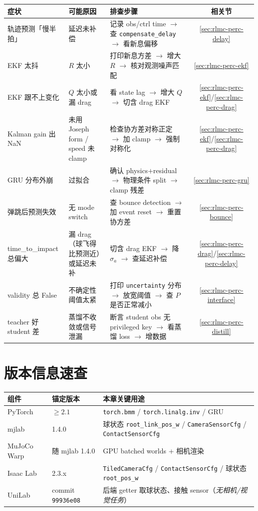 \begin{center}
\small
\begin{tabular}{@{}p{3.0cm}p{3.0cm}p{5.5cm}c@{}}
\toprule
症状 & 可能原因 & 排查步骤 & 相关节 \\
\midrule
轨迹预测「慢半拍」 & 延迟未补偿 & 记录 obs/ctrl time $\to$ 查 \verb|compensate_delay| $\to$ 看新息偏移 & \ref{sec:rlmc-perc-delay} \\
EKF 太抖 & $R$ 太小 & 打印新息方差 $\to$ 增大 $R$ $\to$ 核对观测噪声匹配 & \ref{sec:rlmc-perc-ekf} \\
EKF 跟不上变化 & $Q$ 太小或漏 drag & 看 state lag $\to$ 增大 $Q$ $\to$ 切含 drag EKF & \ref{sec:rlmc-perc-ekf}/\ref{sec:rlmc-perc-drag} \\
Kalman gain 出 NaN & 未用 Joseph form / speed 未 clamp & 检查协方差对称正定 $\to$ 加 clamp $\to$ 强制对称化 & \ref{sec:rlmc-perc-ekf}/\ref{sec:rlmc-perc-drag} \\
GRU 分布外崩 & 过拟合 & 确认 physics$+$residual $\to$ 物理条件 split $\to$ clamp 残差 & \ref{sec:rlmc-perc-gru} \\
弹跳后预测失效 & 无 mode switch & 查 bounce detection $\to$ 加 event reset $\to$ 重置协方差 & \ref{sec:rlmc-perc-bounce} \\
time\_to\_impact 总偏大 & 漏 drag（球飞得比预测近）或延迟未补 & 切含 drag EKF $\to$ 降 $\sigma_a$ $\to$ 查延迟补偿 & \ref{sec:rlmc-perc-drag}/\ref{sec:rlmc-perc-delay} \\
validity 总 False & 不确定性阈值太紧 & 打印 \verb|uncertainty| 分布 $\to$ 放宽阈值 $\to$ 查 $P$ 是否正常减小 & \ref{sec:rlmc-perc-interface} \\
teacher 好 student 差 & 蒸馏不收敛或信号泄漏 & 断言 student obs 无 privileged key $\to$ 看蒸馏 loss $\to$ 增数据 & \ref{sec:rlmc-perc-distill} \\
\bottomrule
\end{tabular}
\end{center}

\section*{版本信息速查}
\label{sec:rlmc-perc-versions}

\begin{center}
\small
\begin{tabular}{@{}lll@{}}
\toprule
组件 & 锚定版本 & 本章关键用途 \\
\midrule
PyTorch & $\ge 2.1$ & \verb|torch.bmm| / \verb|torch.linalg.inv| / GRU \\
mjlab & 1.4.0 & 球状态 \verb|root_link_pos_w| / \verb|CameraSensorCfg| / \verb|ContactSensorCfg| \\
MuJoCo Warp & 随 mjlab 1.4.0 & GPU batched worlds + 相机渲染 \\
Isaac Lab & 2.3.x & \verb|TiledCameraCfg| / \verb|ContactSensorCfg| / 球状态 \verb|root_pos_w| \\
UniLab & commit \texttt{99936e08} & 后端 getter 取球状态、接触 sensor（\emph{无相机/视觉任务}） \\
\bottomrule
\end{tabular}
\end{center}

